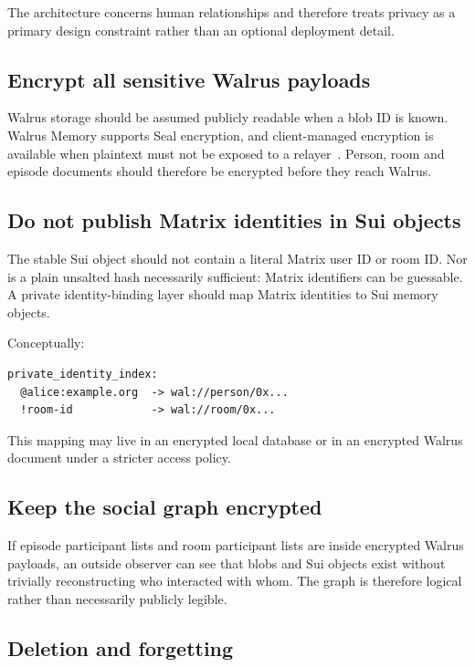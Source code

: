 \documentclass[11pt]{article}
\begin{document}
The architecture concerns human relationships and therefore treats privacy as a primary design constraint rather than an optional deployment detail.

\subsection{Encrypt all sensitive Walrus payloads}

Walrus storage should be assumed publicly readable when a blob ID is known. Walrus Memory supports Seal encryption, and client-managed encryption is available when plaintext must not be exposed to a relayer~\cite{walrus-agent-loop,walrus-console}. Person, room and episode documents should therefore be encrypted before they reach Walrus.

\subsection{Do not publish Matrix identities in Sui objects}

The stable Sui object should not contain a literal Matrix user ID or room ID. Nor is a plain unsalted hash necessarily sufficient: Matrix identifiers can be guessable. A private identity-binding layer should map Matrix identities to Sui memory objects.

Conceptually:

\begin{lstlisting}
private_identity_index:
  @alice:example.org  -> wal://person/0x...
  !room-id            -> wal://room/0x...
\end{lstlisting}

This mapping may live in an encrypted local database or in an encrypted Walrus document under a stricter access policy.

\subsection{Keep the social graph encrypted}

If episode participant lists and room participant lists are inside encrypted Walrus payloads, an outside observer can see that blobs and Sui objects exist without trivially reconstructing who interacted with whom. The graph is therefore logical rather than necessarily publicly legible.

\subsection{Deletion and forgetting}
\end{document}
